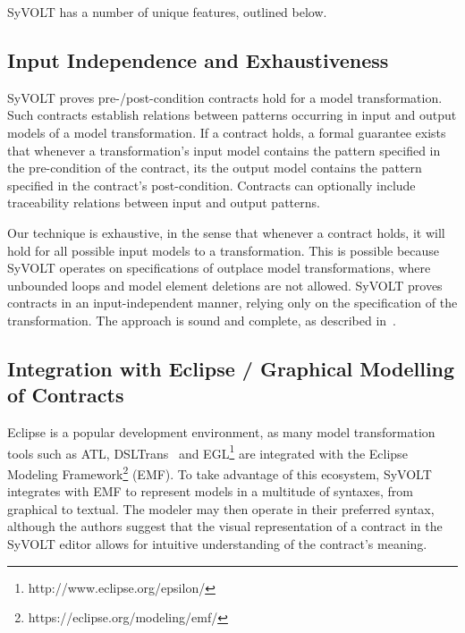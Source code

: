 SyVOLT has a number of unique features, outlined below.

\subsection{Input Independence and Exhaustiveness} 

SyVOLT proves pre-/post-condition contracts hold for a model transformation.
Such contracts establish relations between patterns occurring in input and output
models of a model transformation. If a contract holds, a formal guarantee
exists that whenever a transformation's input model contains the pattern
specified in the pre-condition of the contract, its the output model contains
the pattern specified in the contract's post-condition. Contracts can 
optionally include traceability relations between input and output patterns. 

Our technique is exhaustive, in the sense that whenever a contract holds, it
will hold for all possible input models to a transformation. This is possible
because SyVOLT operates on specifications of outplace model transformations,
where unbounded loops and model element deletions are not allowed. SyVOLT proves
contracts in an input-independent manner, relying only on the specification of the
transformation. The approach is sound and complete, as described
in~\cite{Lucio2014}.



\subsection{Integration with Eclipse / Graphical Modelling of Contracts}

Eclipse is a popular development environment, as many model transformation
tools such as ATL, DSLTrans~\cite{Barroca2011} and
EGL\footnote{http://www.eclipse.org/epsilon/} are integrated with the Eclipse Modeling Framework\footnote{https://eclipse.org/modeling/emf/}
(EMF). To take advantage of this ecosystem, SyVOLT integrates with EMF to represent models in a multitude of syntaxes, from
graphical to textual. The modeler may then operate in their preferred syntax, although the authors suggest that the visual representation of a contract in the SyVOLT editor allows for intuitive understanding of the contract's meaning.




